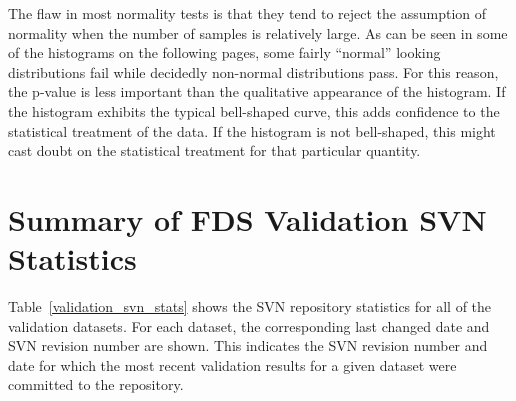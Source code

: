 \documentclass[11pt]{book}
\begin{document}
The flaw in most normality tests is that they tend to reject the assumption of normality when the number of samples is relatively large. As can be seen in some of the histograms on the following pages, some fairly ``normal'' looking distributions fail while decidedly non-normal distributions pass. For this reason, the p-value is less important than the qualitative appearance of the histogram. If the histogram exhibits the typical bell-shaped curve, this adds confidence to the statistical treatment of the data. If the histogram is not bell-shaped, this might cast doubt on the statistical treatment for that particular quantity.



\clearpage


\section{Summary of FDS Validation SVN Statistics}

Table~\ref{validation_svn_stats} shows the SVN repository statistics for all of the validation datasets. For each dataset, the corresponding last changed date and SVN revision number are shown. This indicates the SVN revision number and date for which the most recent validation results for a given dataset were committed to the repository.




\end{document}

